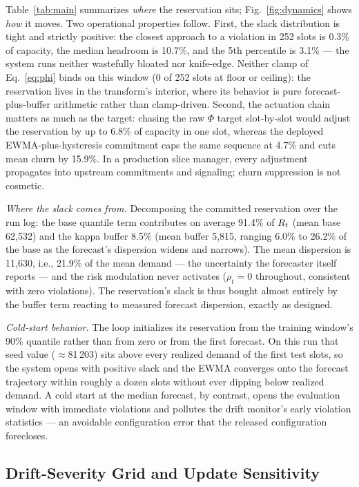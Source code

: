 Table~\ref{tab:main} summarizes \emph{where} the reservation sits;
Fig.~\ref{fig:dynamics} shows \emph{how} it moves. Two operational
properties follow. First, the slack distribution is tight and
strictly positive: the closest approach to a violation in 252 slots
is 0.3\% of capacity, the median headroom is 10.7\%, and the 5th
percentile is 3.1\% --- the system runs neither wastefully bloated
nor knife-edge. Neither clamp of Eq.~\eqref{eq:phi} binds on this
window (0 of 252 slots at floor or ceiling): the reservation lives
in the transform's interior, where its behavior is pure
forecast-plus-buffer arithmetic rather than clamp-driven. Second,
the actuation chain matters as much as the target: chasing the raw
$\Phi$ target slot-by-slot would adjust the reservation by up to
6.8\% of capacity in one slot, whereas the deployed
EWMA-plus-hysteresis commitment caps the same sequence at 4.7\% and
cuts mean churn by 15.9\%. In a production slice manager, every
adjustment propagates into upstream commitments and signaling; churn
suppression is not cosmetic.

\emph{Where the slack comes from.} Decomposing the committed
reservation over the run log: the base quantile term contributes on
average 91.4\% of $R_t$ (mean base 62{,}532) and the kappa buffer
8.5\% (mean buffer 5{,}815, ranging 6.0\% to 26.2\% of the base as
the forecast's dispersion widens and narrows). The mean dispersion
is 11{,}630, i.e., 21.9\% of the mean demand --- the uncertainty the
forecaster itself reports --- and the risk modulation never
activates ($\rho_t = 0$ throughout, consistent with zero
violations). The reservation's slack is thus bought almost entirely
by the buffer term reacting to measured forecast dispersion, exactly
as designed.

\emph{Cold-start behavior.} The loop initializes its reservation from
the training window's 90\% quantile rather than from zero or from the
first forecast. On this run that seed value ($\approx$81\,203) sits
above every realized demand of the first test slots, so the system
opens with positive slack and the EWMA converges onto the forecast
trajectory within roughly a dozen slots without ever dipping below
realized demand. A cold start at the median forecast, by contrast,
opens the evaluation window with immediate violations and pollutes
the drift monitor's early violation statistics --- an avoidable
configuration error that the released configuration forecloses.

\subsection{Drift-Severity Grid and Update Sensitivity}
\label{sec:results-grid}

